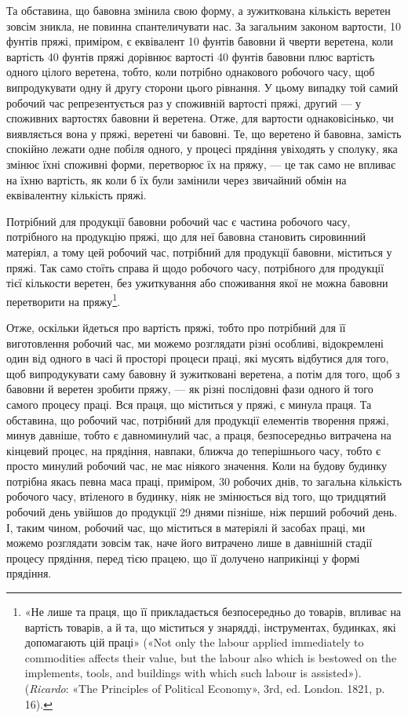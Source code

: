 Та обставина, що бавовна змінила свою форму, а зужиткована
кількість веретен зовсім зникла, не повинна спантеличувати
нас. За загальним законом вартости, 10 фунтів пряжі, приміром,
є еквівалент 10 фунтів бавовни й чверти веретена, коли вартість
40 фунтів пряжі дорівнює вартості 40 фунтів бавовни плюс вартість
одного цілого веретена, тобто, коли потрібно однакового
робочого часу, щоб випродукувати одну й другу сторони цього
рівнання. У цьому випадку той самий робочий час репрезентується
раз у споживній вартості пряжі, другий — у споживних
вартостях бавовни й веретена. Отже, для вартости однаковісінько,
чи виявляється вона у пряжі, веретені чи бавовні. Те, що
веретено й бавовна, замість спокійно лежати одне побіля одного,
у процесі прядіння увіходять у сполуку, яка змінює їхні споживні
форми, перетворює їх на пряжу, — це так само не впливає на
їхню вартість, як коли б їх були замінили через звичайний обмін
на еквівалентну кількість пряжі.

Потрібний для продукції бавовни робочий час є частина робочого
часу, потрібного на продукцію пряжі, що для неї бавовна
становить сировинний матеріял, а тому цей робочий час, потрібний
для продукції бавовни, міститься у пряжі. Так само стоїть
справа й щодо робочого часу, потрібного для продукції тієї кількости
веретен, без ужиткування або споживання якої не можна
бавовни перетворити на пряжу\footnote{
«Не лише та праця, що її прикладається безпосередньо до товарів,
впливає на вартість товарів, а й та, що міститься у знарядді, інструментах,
будинках, які допомагають цій праці» («Not only the labour applied
immediately to commodities affects their value, but the labour also which
is bestowed on the implements, tools, and buildings with which such
labour is assisted»). (\emph{Ricardo}: «The Principles of Political Economy», 3rd,
ed. London. 1821, p. 16).
}.

Отже, оскільки йдеться про вартість пряжі, тобто про потрібний
для її виготовлення робочий час, ми можемо розглядати різні
особливі, відокремлені один від одного в часі й просторі процеси
праці, які мусять відбутися для того, щоб випродукувати саму
бавовну й зужитковані веретена, а потім для того, щоб з бавовни
й веретен зробити пряжу, — як різні послідовні фази одного й
того самого процесу праці. Вся праця, що міститься у пряжі,
є минула праця. Та обставина, що робочий час, потрібний для
продукції елементів творення пряжі, минув давніше, тобто є
давноминулий час, а праця, безпосередньо витрачена на кінцевий
процес, на прядіння, навпаки, ближча до теперішнього часу,
тобто є просто минулий робочий час, не має ніякого значення.
Коли на будову будинку потрібна якась певна маса праці, приміром,
30 робочих днів, то загальна кількість робочого часу,
втіленого в будинку, ніяк не змінюється від того, що тридцятий
робочий день увійшов до продукції 29 днями пізніше, ніж перший
робочий день. І, таким чином, робочий час, що міститься в матеріялі
й засобах праці, ми можемо розглядати зовсім так, наче
його витрачено лише в давнішній стадії процесу прядіння, перед
тією працею, що її долучено наприкінці у формі прядіння.

